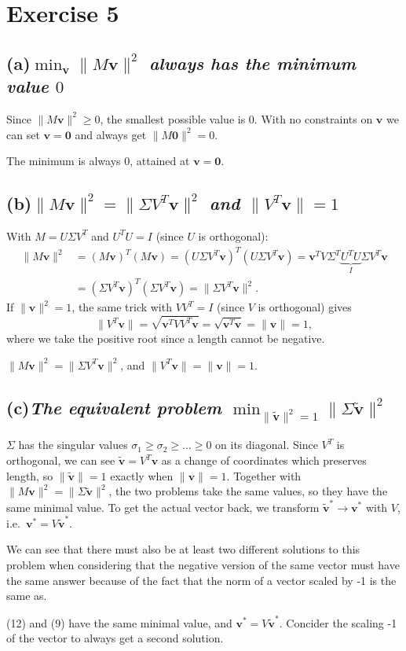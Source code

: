 \documentclass[11pt,a4paper]{article}
\newcommand{\vb}[1]{\mathbf{#1}}
\newcommand{\exercise}[1]{
\section*{Exercise #1}}
\newcommand{\task}[2]{
\subsection*{#1\quad\normalfont\textit{#2}}}
\begin{document}
\exercise{5}

\task{(a)}{$\min_{\vb{v}}\|M\vb{v}\|^2$ always has the minimum value $0$}

Since $\|M\vb{v}\|^2 \geq 0$, the smallest possible value is $0$.
With no constraints on $\vb{v}$
we can set $\vb{v} = \vb{0}$ and always get $\|M\vb{0}\|^2 = 0$.
\begin{answer}
    The minimum is always $0$, attained at $\vb{v} = \vb{0}$.
\end{answer}

\task{(b)}{$\|M\vb{v}\|^2 = \|\Sigma V^T\vb{v}\|^2$ and $\|V^T\vb{v}\| = 1$}

With $M = U\Sigma V^T$ and $U^TU = I$ (since $U$ is orthogonal):
\begin{align*}
    \|M\vb{v}\|^2 &= (M\vb{v})^T(M\vb{v}) = (U\Sigma
    V^T\vb{v})^T(U\Sigma V^T\vb{v})
    = \vb{v}^TV\Sigma^T\underbrace{U^TU}_{I}\Sigma V^T\vb{v}\\
    &= (\Sigma V^T\vb{v})^T(\Sigma V^T\vb{v}) = \|\Sigma V^T\vb{v}\|^2.
\end{align*}
If $\|\vb{v}\|^2 = 1$, the same trick with $VV^T = I$ (since $V$ is
orthogonal) gives
\[
    \|V^T\vb{v}\| = \sqrt{\vb{v}^TVV^T\vb{v}} = \sqrt{\vb{v}^T\vb{v}}
    = \|\vb{v}\| = 1,
\]
where we take the positive root since a length cannot be negative.
\begin{answer}
    $\|M\vb{v}\|^2 = \|\Sigma V^T\vb{v}\|^2$, and $\|V^T\vb{v}\| =
    \|\vb{v}\| = 1$.
\end{answer}

\task{(c)}{The equivalent problem
$\min_{\|\tilde{\vb{v}}\|^2=1}\|\Sigma\tilde{\vb{v}}\|^2$}

$\Sigma$ has the singular values $\sigma_1 \geq \sigma_2 \geq \dots
\geq 0$ on its diagonal.
Since $V^T$ is orthogonal, we can see $\tilde{\vb{v}} = V^T\vb{v}$ as
a change of coordinates which
preserves length, so $\|\tilde{\vb{v}}\| = 1$ exactly when
$\|\vb{v}\| = 1$. Together with
$\|M\vb{v}\|^2 = \|\Sigma\tilde{\vb{v}}\|^2$, the two problems take
the same values, so they have the
same minimal value. To get the actual vector back, we transform
$\tilde{\vb{v}}^* \to \vb{v}^*$ with
$V$, i.e.\ $\vb{v}^* = V\tilde{\vb{v}}^*$.

We can see that there must also be at least two different solutions
to this problem when considering that the negative version of the
same vector must have the same answer because of the fact that the
norm of a vector scaled by -1 is the same as.
\begin{answer}
    (12) and (9) have the same minimal value, and $\vb{v}^* =
    V\tilde{\vb{v}}^*$. Concider the scaling -1 of the vector to
    always get a second solution.
\end{answer}
\end{document}
